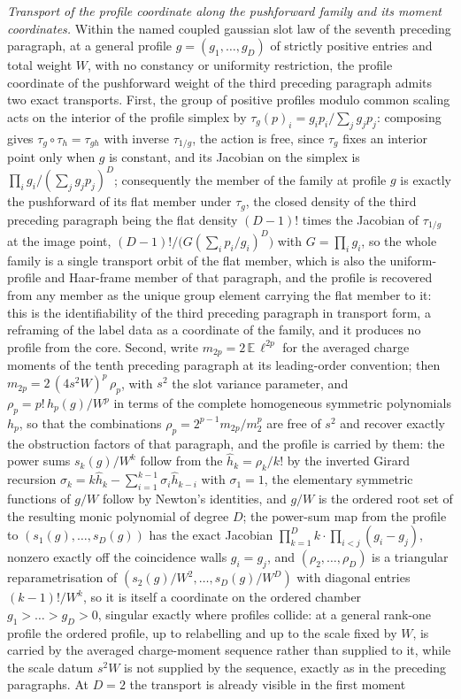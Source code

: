 \emph{Transport of the profile coordinate along the pushforward family and its moment coordinates.} Within the named coupled gaussian slot law of the seventh preceding paragraph, at a general profile \(g=(g_{1},\dots,g_{D})\) of strictly positive entries and total weight \(W\), with no constancy or uniformity restriction, the profile coordinate of the pushforward weight of the third preceding paragraph admits two exact transports. First, the group of positive profiles modulo common scaling acts on the interior of the profile simplex by \(\tau_{g}(p)_{i}=g_{i}p_{i}/\sum_{j}g_{j}p_{j}\): composing gives \(\tau_{g}\circ\tau_{h}=\tau_{gh}\) with inverse \(\tau_{1/g}\), the action is free, since \(\tau_{g}\) fixes an interior point only when \(g\) is constant, and its Jacobian on the simplex is \(\prod_{i}g_{i}/(\sum_{j}g_{j}p_{j})^{D}\); consequently the member of the family at profile \(g\) is exactly the pushforward of its flat member under \(\tau_{g}\), the closed density of the third preceding paragraph being the flat density \((D-1)!\) times the Jacobian of \(\tau_{1/g}\) at the image point, \((D-1)!\big/\bigl(G(\sum_{i}p_{i}/g_{i})^{D}\bigr)\) with \(G=\prod_{i}g_{i}\), so the whole family is a single transport orbit of the flat member, which is also the uniform-profile and Haar-frame member of that paragraph, and the profile is recovered from any member as the unique group element carrying the flat member to it: this is the identifiability of the third preceding paragraph in transport form, a reframing of the label data as a coordinate of the family, and it produces no profile from the core. Second, write \(m_{2p}=2\,\mathbb{E}\,\ell^{2p}\) for the averaged charge moments of the tenth preceding paragraph at its leading-order convention; then \(m_{2p}=2\,(4s^{2}W)^{p}\,\rho_{p}\), with \(s^{2}\) the slot variance parameter, and \(\rho_{p}=p!\,h_{p}(g)/W^{p}\) in terms of the complete homogeneous symmetric polynomials \(h_{p}\), so that the combinations \(\rho_{p}=2^{p-1}m_{2p}/m_{2}^{p}\) are free of \(s^{2}\) and recover exactly the obstruction factors of that paragraph, and the profile is carried by them: the power sums \(s_{k}(g)/W^{k}\) follow from the \(\hat h_{k}=\rho_{k}/k!\) by the inverted Girard recursion \(\sigma_{k}=k\hat h_{k}-\sum_{i=1}^{k-1}\sigma_{i}\hat h_{k-i}\) with \(\sigma_{1}=1\), the elementary symmetric functions of \(g/W\) follow by Newton's identities, and \(g/W\) is the ordered root set of the resulting monic polynomial of degree \(D\); the power-sum map from the profile to \((s_{1}(g),\dots,s_{D}(g))\) has the exact Jacobian \(\prod_{k=1}^{D}k\cdot\prod_{i<j}(g_{i}-g_{j})\), nonzero exactly off the coincidence walls \(g_{i}=g_{j}\), and \((\rho_{2},\dots,\rho_{D})\) is a triangular reparametrisation of \((s_{2}(g)/W^{2},\dots,s_{D}(g)/W^{D})\) with diagonal entries \((k-1)!/W^{k}\), so it is itself a coordinate on the ordered chamber \(g_{1}>\dots>g_{D}>0\), singular exactly where profiles collide: at a general rank-one profile the ordered profile, up to relabelling and up to the scale fixed by \(W\), is carried by the averaged charge-moment sequence rather than supplied to it, while the scale datum \(s^{2}W\) is not supplied by the sequence, exactly as in the preceding paragraphs. At \(D=2\) the transport is already visible in the first moment 